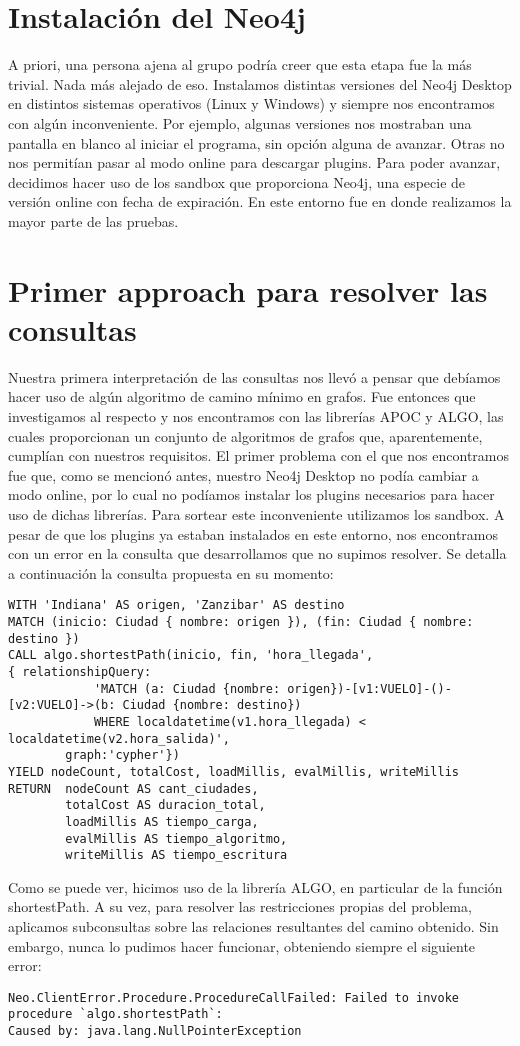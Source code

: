 \documentclass[a4paper,11pt]{article}
\begin{document}
\section{Instalación del Neo4j}
A priori, una persona ajena al grupo podría creer que esta etapa fue la más trivial. Nada más alejado de eso.
Instalamos distintas versiones del Neo4j Desktop en distintos sistemas operativos (Linux y Windows) y siempre nos encontramos con algún inconveniente. Por ejemplo, algunas versiones nos mostraban una pantalla en blanco al iniciar el programa, sin opción alguna de avanzar. Otras no nos permitían pasar al modo online para descargar plugins.
Para poder avanzar, decidimos hacer uso de los sandbox que proporciona Neo4j, una especie de versión online con fecha de expiración. En este entorno fue en donde realizamos la mayor parte de las pruebas.

\section{Primer approach para resolver las consultas}
Nuestra primera interpretación de las consultas nos llevó a pensar que debíamos hacer uso de algún algoritmo de camino mínimo en grafos. Fue entonces que investigamos al respecto y nos encontramos con las librerías APOC y ALGO, las cuales proporcionan un conjunto de algoritmos de grafos que, aparentemente, cumplían con nuestros requisitos.
El primer problema con el que nos encontramos fue que, como se mencionó antes, nuestro Neo4j Desktop no podía cambiar a modo online, por lo cual no podíamos instalar los plugins necesarios para hacer uso de dichas librerías.
Para sortear este inconveniente utilizamos los sandbox. A pesar de que los plugins ya estaban instalados en este entorno, nos encontramos con un error en la consulta que desarrollamos que no supimos resolver.
Se detalla a continuación la consulta propuesta en su momento:
\begin{verbatim}
WITH 'Indiana' AS origen, 'Zanzibar' AS destino
MATCH (inicio: Ciudad { nombre: origen }), (fin: Ciudad { nombre: destino })
CALL algo.shortestPath(inicio, fin, 'hora_llegada',
{ relationshipQuery:
			'MATCH (a: Ciudad {nombre: origen})-[v1:VUELO]-()-[v2:VUELO]->(b: Ciudad {nombre: destino})
			WHERE localdatetime(v1.hora_llegada) < localdatetime(v2.hora_salida)',
		graph:'cypher'})
YIELD nodeCount, totalCost, loadMillis, evalMillis, writeMillis
RETURN 	nodeCount AS cant_ciudades,
		totalCost AS duracion_total,
		loadMillis AS tiempo_carga,
		evalMillis AS tiempo_algoritmo,
		writeMillis AS tiempo_escritura
\end{verbatim}
Como se puede ver, hicimos uso de la librería ALGO, en particular de la función shortestPath. A su vez, para resolver las restricciones propias del problema, aplicamos subconsultas sobre las relaciones resultantes del camino obtenido.
Sin embargo, nunca lo pudimos hacer funcionar, obteniendo siempre el siguiente error:
\begin{verbatim}
Neo.ClientError.Procedure.ProcedureCallFailed: Failed to invoke 
procedure `algo.shortestPath`:
Caused by: java.lang.NullPointerException
\end{verbatim}
\end{document}
